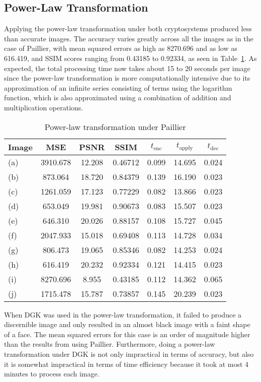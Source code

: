 \subsection{Power-Law Transformation}
Applying the power-law transformation under both cryptosystems produced less than accurate images. The accuracy varies greatly across all the images as in the case of Paillier, with mean squared errors as high as 8270.696 and as low as 616.419, and SSIM scores ranging from 0.43185 to 0.92334, as seen in Table~\ref{tbl:pwr-pal}. As expected, the total processing time now takes about 15 to 20 seconds per image since the power-law transformation is more computationally intensive due to its approximation of an infinite series consisting of terms using the logarithm function, which is also approximated using a combination of addition and multiplication operations.

\begin{table}[t]
	\centering
	\caption{Power-law transformation under Paillier}
	\label{tbl:pwr-pal}
    \begin{tabular}{lcccccc}
        \hline
        Image & MSE  & PSNR & SSIM & $t_\text{enc}$ & $t_\text{apply}$ & $t_\text{dec}$ \\ \hline
        (a) & 3910.678 & 12.208 & 0.46712 & 0.099 & 14.695 & 0.024 \\
		(b) & 873.064 & 18.720 & 0.84379 & 0.139 & 16.190 & 0.023 \\
		(c) & 1261.059 & 17.123 & 0.77229 & 0.082 & 13.866 & 0.023 \\
		(d) & 653.049 & 19.981 & 0.90673 & 0.083 & 15.507 & 0.023 \\
		(e) & 646.310 & 20.026 & 0.88157 & 0.108 & 15.727 & 0.045 \\
		(f) & 2047.933 & 15.018 & 0.69408 & 0.113 & 14.728 & 0.034 \\
		(g) & 806.473 & 19.065 & 0.85346 & 0.082 & 14.253 & 0.024 \\
		(h) & 616.419 & 20.232 & 0.92334 & 0.121 & 14.415 & 0.023 \\
		(i) & 8270.696 & 8.955 & 0.43185 & 0.112 & 14.362 & 0.065 \\
		(j) & 1715.478 & 15.787 & 0.73857 & 0.145 & 20.239 & 0.023 \\
		\hline
        \end{tabular}
\end{table}

When DGK was used in the power-law transformation, it failed to produce a discernible image and only resulted in an almost black image with a faint shape of a face. The mean squared errors for this case is an order of magnitude higher than the results from using Paillier. Furthermore, doing a power-law transformation under DGK is not only impractical in terms of accuracy, but also it is somewhat impractical in terms of time efficiency because it took at most 4 minutes to process each image.

